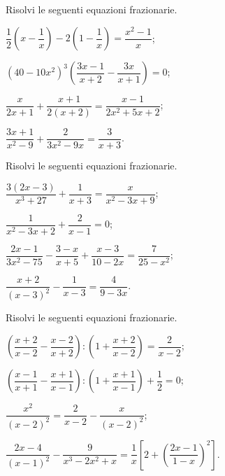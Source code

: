\begin{esercizio}[\Ast]
\label{ese:17.28}
Risolvi le seguenti equazioni frazionarie.
\begin{multicols}{2}
\begin{enumeratea}
 \item $\dfrac{1}{2} \left(x-\dfrac{1}{x}\right)-2\left(1-\dfrac{1}{x}\right)=\dfrac{x^{2}-1}{x}$;
 \item $\left(40-10x^{2}\right)^{3} \left(\dfrac{3x-1}{x+2}-\dfrac{3x}{x+1}\right)=0$;
 \item $\dfrac{x}{2x+1}+\dfrac{x+1}{2(x+2)}=\dfrac{x-1}{2x^{2}+5x+2}$;
 \item $\dfrac{3x+1}{x^{2}-9}+\dfrac{2}{3x^{2}-9x}=\dfrac{3}{x+3}$.
\end{enumeratea}
\end{multicols}
\end{esercizio}

\begin{esercizio}[\Ast]
\label{ese:17.29}
Risolvi le seguenti equazioni frazionarie.
\begin{multicols}{2}
\begin{enumeratea}
 \item $\dfrac{3(2x-3)}{x^{3}+27}+\dfrac{1}{x+3}=\dfrac{x}{x^{2}-3x+9}$;
 \item $\dfrac{1}{x^{2}-3x+2}+\dfrac{2}{x-1}=0$;
 \item $\dfrac{2x-1}{3x^{2}-75}-\dfrac{3-x}{x+5}+\dfrac{x-3}{10-2x}=\dfrac{7}{25-x^{2}}$;
 \item $\dfrac{x+2}{(x-3)^{2}}-\dfrac{1}{x-3}=\dfrac{4}{9-3x}$.
\end{enumeratea}
\end{multicols}
\end{esercizio}

\begin{esercizio}[\Ast]
\label{ese:17.30}
Risolvi le seguenti equazioni frazionarie.
\begin{enumeratea}
 \item $\left(\dfrac{x+2}{x-2}-\dfrac{x-2}{x+2}\right):\left(1+\dfrac{x+2}{x-2}\right)=\dfrac{2}{x-2}$;
 \item $\left(\dfrac{x-1}{x+1}-\dfrac{x+1}{x-1}\right):\left(1+\dfrac{x+1}{x-1}\right)+\dfrac{1}{2}=0$;
 \item $\dfrac{x^{2}}{(x-2)^{2}}=\dfrac{2}{x-2}-\dfrac{x}{(x-2)^{2}}$;
 \item $\dfrac{2x-4}{(x-1)^{2}}-\dfrac{9}{x^{3}-2x^{2}+x}=\dfrac{1}{x}\left[2+\left(\dfrac{2x-1}{1-x}\right)^{2}\right]$.
\end{enumeratea}
\end{esercizio}

